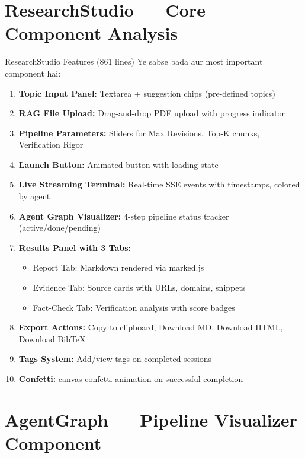\documentclass[11pt,a4paper,twoside]{report}
\begin{document}
\section{ResearchStudio --- Core Component Analysis}

\begin{conceptbox}{ResearchStudio Features (861 lines)}
Ye sabse bada aur most important component hai:

\begin{enumerate}
    \item \textbf{Topic Input Panel:} Textarea + suggestion chips (pre-defined topics)
    \item \textbf{RAG File Upload:} Drag-and-drop PDF upload with progress indicator
    \item \textbf{Pipeline Parameters:} Sliders for Max Revisions, Top-K chunks, Verification Rigor
    \item \textbf{Launch Button:} Animated button with loading state
    \item \textbf{Live Streaming Terminal:} Real-time SSE events with timestamps, colored by agent
    \item \textbf{Agent Graph Visualizer:} 4-step pipeline status tracker (active/done/pending)
    \item \textbf{Results Panel with 3 Tabs:}
    \begin{itemize}
        \item Report Tab: Markdown rendered via marked.js
        \item Evidence Tab: Source cards with URLs, domains, snippets
        \item Fact-Check Tab: Verification analysis with score badges
    \end{itemize}
    \item \textbf{Export Actions:} Copy to clipboard, Download MD, Download HTML, Download BibTeX
    \item \textbf{Tags System:} Add/view tags on completed sessions
    \item \textbf{Confetti:} canvas-confetti animation on successful completion
\end{enumerate}
\end{conceptbox}

\section{AgentGraph --- Pipeline Visualizer Component}
\end{document}

